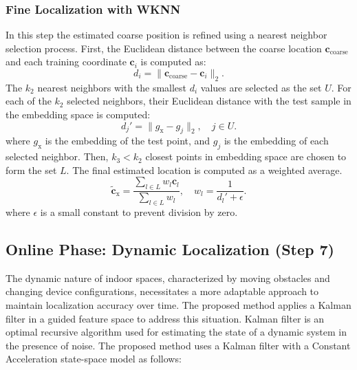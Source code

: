 \documentclass[journal,twoside,web]{ieeecolor}
\begin{document}
\subsubsection{Fine Localization with WKNN}
In this step the estimated coarse position is refined using a nearest neighbor selection process. 
First, the Euclidean distance between the coarse location $\mathbf{c}_{\text{coarse}}$ and each training coordinate $\mathbf{c}_i$ is computed as:
\begin{equation}
    d_i = \| \mathbf{c}_{\text{coarse}} - \mathbf{c}_i \|_2 .
\end{equation}
The $k_2$ nearest neighbors with the smallest $d_i$ values are selected as the set $U$.
 For each of the $k_2$ selected neighbors, their Euclidean distance with the test sample in the embedding space is computed:
\begin{equation}
    d_j' = \| g_{\text{x}} - g_j \|_2 , \quad j \in U .
\end{equation}
where $g_{\text{x}}$ is the embedding of the test point, and $g_j$ is the embedding of each selected neighbor. Then, $k_3 < k_2$ closest points in embedding space are chosen to form the set $L$.
The final estimated location is computed as a weighted average.
\begin{equation}
    \mathbf{\tilde{c}}_{\text{x}} = \frac{\sum_{l \in L } w_l \mathbf{c}_l}{\sum_{l \in L} w_l}, \quad  w_l = \frac{1}{d_l' + \epsilon }.
\end{equation}
 where $\epsilon$ is a small constant to prevent division by zero. 
\subsection{Online Phase: Dynamic Localization (Step 7)} 
The dynamic nature of indoor spaces, characterized by moving obstacles and changing device configurations, necessitates a more adaptable approach to maintain localization accuracy over time.
The proposed method applies a Kalman filter in a guided feature space to address this situation. Kalman filter is an optimal recursive algorithm used for estimating the state of a dynamic system in the presence of noise. The proposed method uses a  Kalman filter with a Constant Acceleration state-space model as follows: 
\end{document}

